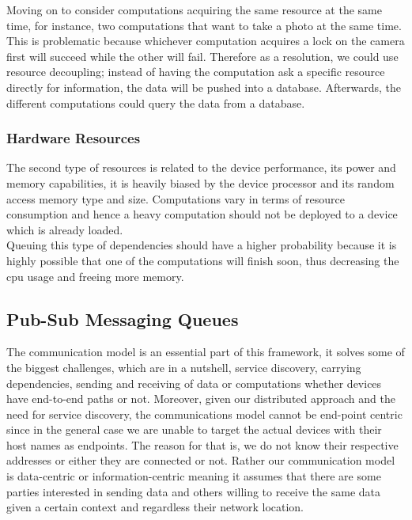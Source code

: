   \noindent Moving on to consider computations acquiring the same resource at the same time, for instance, two computations that want to take a photo at the same time. This is problematic because whichever computation acquires a lock on the camera first will succeed while the other will fail. Therefore as a resolution, we could use resource decoupling; instead of having the computation ask a specific resource directly for information, the  data will be pushed into a database. Afterwards, the different computations could query the data from a database.
  
  

\subsubsection{Hardware Resources }

The second type of resources is related to the device performance, its power and memory capabilities, it is heavily biased by the  device processor  and its random access memory type and size. Computations vary in terms of resource consumption and hence a heavy computation should not be deployed to a device which is already loaded. \\

\noindent Queuing this type of dependencies should have a higher probability because it is highly possible that one of the computations will finish soon, thus decreasing the cpu usage and freeing more memory.







\subsection{Pub-Sub Messaging Queues}\label{subsec:pub-sub}

The communication model is an essential part of this framework, it solves some of the biggest challenges, which are in a nutshell, service discovery, carrying dependencies, sending and receiving of data or computations whether devices have  end-to-end paths or not. Moreover, given our distributed approach and the need for service discovery, the communications model cannot be  end-point centric since in the general case we are unable to target the actual devices with their host names as endpoints. The reason for that is, we do not know their respective addresses or either they are connected or not. Rather our communication model is data-centric or information-centric meaning it assumes that there are some parties interested in sending data and others willing to receive the same data given a certain context and regardless their network location. \\

